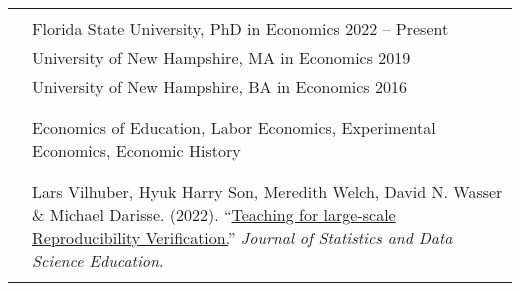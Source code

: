 \documentclass[letterpaper, 11pt]{article}
\begin{document}
\begin{longtable}{p{0.1in}p{5.9in}}


\color{Maroon}{EDUCATION} \\
& Florida State University, PhD in Economics  \hfill 2022 -- Present \\
& University of New Hampshire, MA in Economics \hfill 2019 \\
& University of New Hampshire, BA in Economics  \hfill 2016 \\ & \\


\multicolumn{2}{l}{\nohyphens{\color{Maroon}{RESEARCH INTERESTS}}} \\
& Economics of Education, Labor Economics, Experimental Economics, Economic History \\
& \\




\multicolumn{2}{l}{\nohyphens{\color{Maroon}{PUBLICATIONS}}}\\

& Lars Vilhuber, Hyuk Harry Son, Meredith Welch, David N. Wasser \& Michael Darisse. (2022). ``\href{https://www.tandfonline.com/doi/full/10.1080/26939169.2022.2074582}{Teaching for large-scale Reproducibility Verification.}'' \textit{Journal of Statistics and Data Science Education}. \\ & \\


\end{longtable}
\end{document}
